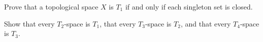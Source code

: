 \begin{comment}
	\end{enumerate}
	
\item Now consider the subset $B = \{0\}$ of $(\Z, \tau_{bl})$. 
	\begin{enumerate}[i.]
	\item  No neighborhood $0$ can contain a point of $\{0\}$ other than $0$, so $0$ is not a limit point of $\{0\}$. If $n \neq 0$, then the open neighborhood $B(n)$ contains no points of $\{0\}$. Therefore, $\{0\}' = \emptyset$. 

Any neighborhood of $0$ must contain $B(0) = \{-1,0,1\}$, and so every neighborhood of $0$ contains a point in $\{0\}$ and a point not in $\{0\}$. So $0$ is a boundary point of $\{0\}$. If $n \neq 0$, then the open neighborhood $B(n)$ contains no points in $\{0\}$. Therefore, $\Bdry(\{0\}) = \{0\}$. Every limit point of $B$ is a boundary point of $B$, but $0$ is a boundary point of $\{0\}$ that is not a limit point of $\{0\}$.  

	\item  In this case
\[\overline{\{0\}} = B  \cup B' = \{0\} = \Z \setminus \bigcup_{|n|\geq 1} B(n).\]
So
\[X \setminus \overline{B} = \bigcup_{|n|\geq 1} B(n).\]


	\end{enumerate}
	
\ea


\end{comment}

\item \label{ex:T_1_2_3}
\ba

\item Prove that a topological space $X$ is $T_1$ if and only if each singleton set is closed.

\item Show that every $T_2$-space is $T_1$, that every $T_3$-space is $T_2$, and that every $T_4$-space is $T_3$. 

\ea

